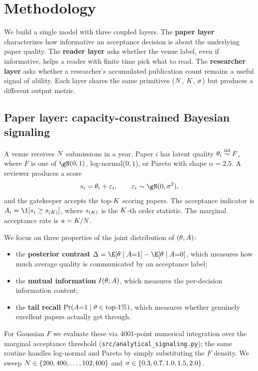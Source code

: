 \section{Methodology}
\label{sec:method}

We build a single model with three coupled layers. The {\bf paper layer} characterizes how informative an acceptance decision is about the underlying paper quality. The {\bf reader layer} asks whether the venue label, even if informative, helps a reader with finite time pick what to read. The {\bf researcher layer} asks whether a researcher's accumulated publication count remains a useful signal of ability. Each layer shares the same primitives ($N$, $K$, $\sigma$) but produces a different output metric.

\subsection{Paper layer: capacity-constrained Bayesian signaling}
\label{sec:method-paper}

A venue receives $N$ submissions in a year. Paper $i$ has latent quality $\theta_i \overset{\text{iid}}{\sim} F$, where $F$ is one of $\gN(0,1)$, log-normal($0,1$), or Pareto with shape $\alpha=2.5$. A reviewer produces a score
\begin{equation}
    \score_i = \quality_i + \varepsilon_i, \qquad \varepsilon_i \sim \gN(0,\sigrev^2),
\end{equation}
and the gatekeeper accepts the top-$K$ scoring papers. The acceptance indicator is $\acc_i = \1[\score_i \ge \score_{(\Kcap)}]$, where $s_{(K)}$ is the $K$-th order statistic. The marginal acceptance rate is $a = K/N$.

We focus on three properties of the joint distribution of $(\theta, A)$:
\begin{itemize}[leftmargin=*,itemsep=0pt,topsep=0pt]
    \item the {\bf posterior contrast} $\contrast = \E[\quality\mid\acc{=}1] - \E[\quality\mid\acc{=}0]$, which measures how much average quality is communicated by an acceptance label;
    \item the {\bf mutual information} $I(\theta;A)$, which measures the per-decision information content;
    \item the {\bf tail recall} $\Pr(A{=}1\mid \theta \in \text{top-1\%})$, which measures whether genuinely excellent papers actually get through.
\end{itemize}
For Gaussian $F$ we evaluate these via $4001$-point numerical integration over the marginal acceptance threshold (\texttt{src/analytical\_signaling.py}); the same routine handles log-normal and Pareto by simply substituting the $F$ density. We sweep $N \in \{200, 400, \dots, 102{,}400\}$ and $\sigma \in \{0.3, 0.7, 1.0, 1.5, 2.0\}$.

